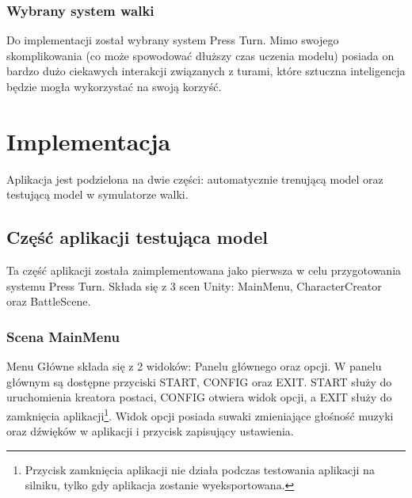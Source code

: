 \documentclass{SGGW-thesis}
\begin{document}
\subsection*{Wybrany system walki}
Do implementacji został wybrany system Press Turn. Mimo swojego skomplikowania (co może spowodować dłuższy czas uczenia modelu) posiada on bardzo dużo ciekawych interakcji związanych z turami, które sztuczna inteligencja będzie mogła wykorzystać na swoją korzyść.


\chapter{Implementacja}
Aplikacja jest podzielona na dwie części: automatycznie trenującą model oraz testującą model w symulatorze walki.


\section{Część aplikacji testująca model}
Ta część aplikacji została zaimplementowana jako pierwsza w celu przygotowania systemu Press Turn. Składa się z 3 scen Unity: MainMenu, CharacterCreator oraz BattleScene.

\subsection{Scena MainMenu}
Menu Główne składa się z 2 widoków: Panelu głównego oraz opcji. W panelu głównym są dostępne przyciski START, CONFIG oraz EXIT. START służy do uruchomienia kreatora postaci, CONFIG otwiera widok opcji, a EXIT służy do zamknięcia aplikacji\footnote{Przycisk zamknięcia aplikacji nie działa podczas testowania aplikacji na silniku, tylko gdy aplikacja zostanie wyeksportowana.}.
Widok opcji posiada suwaki zmieniające głośność muzyki oraz dźwięków w aplikacji i przycisk zapisujący ustawienia.
\end{document}
